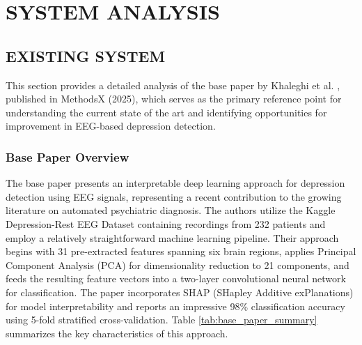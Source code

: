 
\chapter{SYSTEM ANALYSIS}

\section{EXISTING SYSTEM}

This section provides a detailed analysis of the base paper by Khaleghi et al. \cite{khaleghi2025interpretable}, published in MethodsX (2025), which serves as the primary reference point for understanding the current state of the art and identifying opportunities for improvement in EEG-based depression detection.

\subsection{Base Paper Overview}

The base paper presents an interpretable deep learning approach for depression detection using EEG signals, representing a recent contribution to the growing literature on automated psychiatric diagnosis. The authors utilize the Kaggle Depression-Rest EEG Dataset containing recordings from 232 patients and employ a relatively straightforward machine learning pipeline. Their approach begins with 31 pre-extracted features spanning six brain regions, applies Principal Component Analysis (PCA) for dimensionality reduction to 21 components, and feeds the resulting feature vectors into a two-layer convolutional neural network for classification. The paper incorporates SHAP (SHapley Additive exPlanations) for model interpretability and reports an impressive 98\% classification accuracy using 5-fold stratified cross-validation. Table \ref{tab:base_paper_summary} summarizes the key characteristics of this approach.

